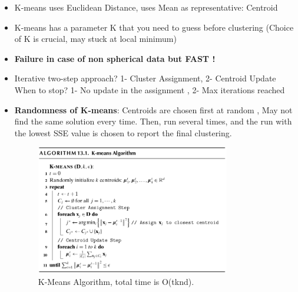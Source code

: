 \begin{itemize}
    \item K-means  uses Euclidean Distance, uses Mean as representative: Centroid
    \item K-means  has a parameter K that you need to guess before clustering (Choice of K is crucial, may stuck at local minimum)
    \item \textbf{Failure in case of non spherical data but FAST !}
    \item Iterative two-step approach?  1- Cluster Assignment,  2- Centroid Update\\When to stop?  1- No update in the assignment  , 2- Max iterations reached
    \item \textbf{Randomness of K-means}: Centroids are chosen first at random , May not find the same solution every time. Then, run several times, and the run with the lowest SSE value is chosen to report the final clustering.
    \begin{figure}[H]
        \includegraphics[width=0.8\textwidth]{Figures/kmeans.png}
        \caption{\label{fig:figure3}K-Means Algorithm, total time is O(tknd).}
    \end{figure}
\end{itemize}